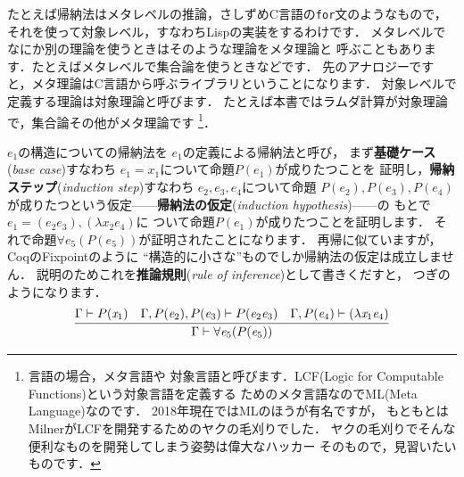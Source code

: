 \documentclass{ltjsbook}%
\newcommand\term[2]{\textbf{#1}{(\textit{#2})}}%
\begin{document}
たとえば帰納法はメタレベルの推論，さしずめC言語の\texttt{for}文のようなもので，%
それを使って対象レベル，すなわちLispの実装をするわけです．%
メタレベルでなにか別の理論を使うときはそのような理論をメタ理論と%
呼ぶこともあります．たとえばメタレベルで集合論を使うときなどです．%
先のアナロジーですと，メタ理論はC言語から呼ぶライブラリということになります．%
対象レベルで定義する理論は対象理論と呼びます．%
たとえば本書ではラムダ計算が対象理論で，集合論その他がメタ理論です%
\footnote{言語の場合，メタ言語や%
  対象言語と呼びます．LCF(Logic for Computable Functions)という対象言語を定義する%
  ためのメタ言語なのでML(Meta Language)なのです．%
  2018年現在ではMLのほうが有名ですが，%
  もともとはMilnerがLCFを開発するためのヤクの毛刈りでした．%
  ヤクの毛刈りでそんな便利なものを開発してしまう姿勢は偉大なハッカー%
  そのもので，見習いたいものです．}．%
\fi%
\par$\mathit{e}_1$の構造についての帰納法を%
$\mathit{e}_1$の定義による帰納法と呼び，%
まず\term{基礎ケース}{base case}すなわち%
$\mathit{e}_1 = \mathit{x}_1$について命題$P(\mathit{e}_1)$が成りたつことを%
証明し，\term{帰納ステップ}{induction step}すなわち%
$\mathit{e}_2,\mathit{e}_3,\mathit{e}_4$について命題%
$P(\mathit{e}_2),P(\mathit{e}_3),P(\mathit{e}_4)$%
が成りたつという仮定------\term{帰納法の仮定}{induction hypothesis}------の%
もとで%
$\mathit{e}_1 = (\mathit{e}_2\mathit{e}_3),(\lambda\mathit{x}_2\mathit{e}_4)$に%
ついて命題$P(\mathit{e}_1)$が成りたつことを証明します．%
それで命題$\forall\mathit{e}_5(P(\mathit{e}_5))$が証明されたことになります．%
再帰に似ていますが，CoqのFixpointのように%
``構造的に小さな''ものでしか帰納法の仮定は成立しません．%
説明のためこれを\term{推論規則}{rule of inference}として書きくだすと，%
つぎのようになります．%
\begin{equation}%
  \infer{%
    \Gamma\vdash\forall\mathit{e}_5(P(\mathit{e}_5))%
  }{%
    \Gamma\vdash P(\mathit{x}_1)%
  &%
    \Gamma,P(\mathit{e}_2),P(\mathit{e}_3)\vdash P(\mathit{e}_2\mathit{e}_3)%
  &%
    \Gamma,P(\mathit{e}_4)\vdash (\lambda\mathit{x}_1\mathit{e}_4)%
  }%
\end{equation}%
\end{document}
